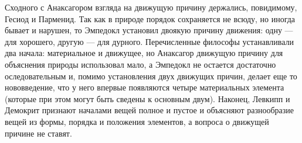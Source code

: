 \documentclass{article}
\begin{document}
Сходного с Анаксагором взгляда на движущую причину держались, повидимому, Гесиод и Парменид. Так как в природе порядок сохраняется не всюду, но иногда бывает и нарушен, то Эмпедокл установил двоякую причину движения: одну --- для хорошего, другую --- для дурного. Перечисленные философы устанавливали два начала: материальное и движущее, но Анаксагор движущую причину для объяснения природы использовал мало, а Эмпедокл не остается достаточно оследовательным и, помимо установления двух движущих причин, делает еще то нововведение, что у него впервые появляются четыре материальных элемента (которые при этом могут быть сведены к основным двум). Наконец, Левкипп и Демокрит признают началами вещей полное и пустое и объясняют разнообразие вещей из формы, порядка и положения элементов, а вопроса о движущей причине не ставят.
\end{document}
